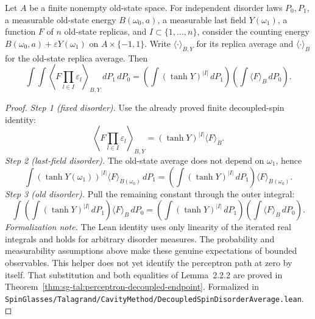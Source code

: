 \begin{lemma}\label{lem:sg-tal:perceptron-decoupled-disorder}
  \leanok
{}
Let $A$ be a finite nonempty old-state space. For independent disorder laws $P_0,P_1$, a measurable
old-state energy $B(\omega_0,a)$, a measurable last field $Y(\omega_1)$, a function $F$ of $n$ old-state
replicas, and $I\subset\{1,\ldots,n\}$, consider the counting energy
$B(\omega_0,a)+\varepsilon Y(\omega_1)$ on $A\times\{-1,1\}$. Write $\langle\cdot\rangle_{B,Y}$
for its replica average and $\langle\cdot\rangle_B$ for the old-state replica average. Then
\[
 \int\!\int\left\langle F\prod_{l\in I}\varepsilon_l\right\rangle_{B,Y}\,dP_1\,dP_0
 =\left(\int(\tanh Y)^{|I|}\,dP_1\right)
   \left(\int\langle F\rangle_B\,dP_0\right).
\]
\end{lemma}
\begin{proof}
  \leanok
\emph{Step 1 (fixed disorder).} Use the already proved finite decoupled-spin identity:
\[
 \left\langle F\prod_{l\in I}\varepsilon_l\right\rangle_{B,Y}
 =(\tanh Y)^{|I|}\langle F\rangle_B.
\]
\emph{Step 2 (last-field disorder).} The old-state average does not depend on $\omega_1$, hence
\[
 \int(\tanh Y(\omega_1))^{|I|}\langle F\rangle_{B(\omega_0)}\,dP_1
 =\left(\int(\tanh Y)^{|I|}\,dP_1\right)\langle F\rangle_{B(\omega_0)}.
\]
\emph{Step 3 (old disorder).} Pull the remaining constant through the outer integral:
\[
 \int\left(\int(\tanh Y)^{|I|}\,dP_1\right)\langle F\rangle_B\,dP_0
 =\left(\int(\tanh Y)^{|I|}\,dP_1\right)\left(\int\langle F\rangle_B\,dP_0\right).
\]
\emph{Formalization note.} The Lean identity uses only linearity of the iterated real integrals
and holds for arbitrary disorder measures. The probability and measurability assumptions above
make these genuine expectations of bounded observables. This helper does not yet identify the
perceptron path at zero by itself. That substitution and both equalities of Lemma~2.2.2 are
proved in Theorem~\ref{thm:sg-tal:perceptron-decoupled-endpoint}.
Formalized in \texttt{SpinGlasses/Talagrand/CavityMethod/DecoupledSpinDisorderAverage.lean}.
\end{proof}

